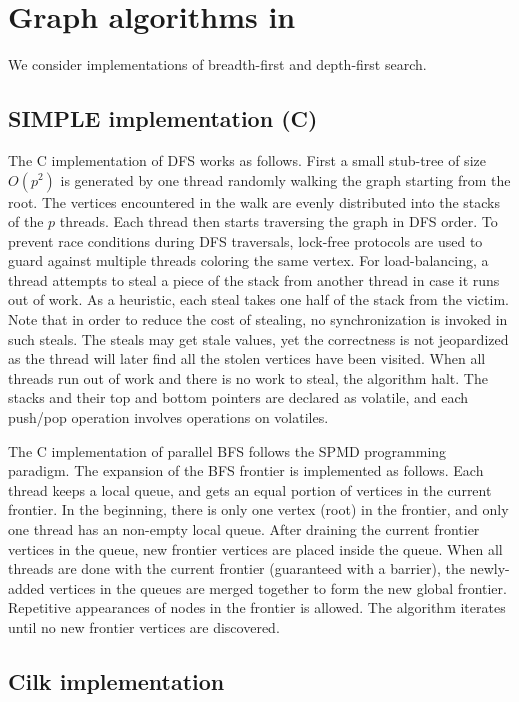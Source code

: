 \section{Graph algorithms in \XWS}\label{sec:Graph}

We consider implementations of breadth-first and depth-first search.


\subsection{SIMPLE implementation (C)}

The C implementation of DFS works as follows. First a small stub-tree
of size $O(p^2)$ is generated by one thread randomly walking the graph
starting from the root.  The vertices encountered in the walk are
evenly distributed into the stacks of the $p$ threads. Each thread
then starts traversing the graph in DFS order.  To prevent race
conditions during DFS traversals, lock-free protocols are used to
guard against multiple threads coloring the same vertex. For
load-balancing, a thread attempts to steal a piece of the stack from
another thread in case it runs out of work. As a heuristic, each steal
takes one half of the stack from the victim. Note that in order to
reduce the cost of stealing, no synchronization is invoked in such
steals. The steals may get stale values, yet the correctness is not
jeopardized as the thread will later find all the stolen vertices have
been visited.  When all threads run out of work and there is no work
to steal, the algorithm halt. The stacks and their top and bottom
pointers are declared as volatile, and each push/pop operation
involves operations on volatiles.

The C implementation of parallel BFS follows the SPMD programming
paradigm. The expansion of the BFS frontier is implemented as
follows. Each thread keeps a local queue, and gets an equal portion of
vertices in the current frontier. In the beginning, there is only one
vertex (root) in the frontier, and only one thread has an non-empty
local queue. After draining the current frontier vertices in the
queue, new frontier vertices are placed inside the queue. When all
threads are done with the current frontier (guaranteed with a
barrier), the newly-added vertices in the queues are merged together
to form the new global frontier. Repetitive appearances of nodes in
the frontier is allowed. The algorithm iterates until no new frontier
vertices are discovered.

\subsection{Cilk implementation}

